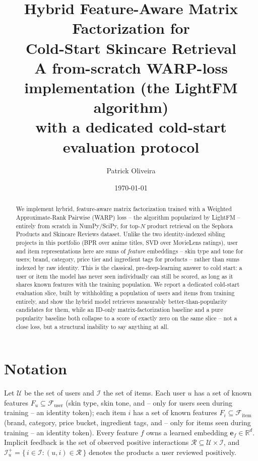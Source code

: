 \documentclass[11pt,a4paper]{article}
\title{\textbf{Hybrid Feature-Aware Matrix Factorization for\\
Cold-Start Skincare Retrieval}\\[0.4em]
\large A from-scratch WARP-loss implementation (the LightFM algorithm)\\
with a dedicated cold-start evaluation protocol}
\author{Patrick Oliveira}
\date{\today}
\newcommand{\Uset}{\mathcal{U}}
\newcommand{\Iset}{\mathcal{I}}
\newcommand{\Fset}{\mathcal{F}}
\newcommand{\Rset}{\mathcal{R}}
\newcommand{\evec}{\mathbf{e}}
\begin{document}
\maketitle

\begin{abstract}
We implement hybrid, feature-aware matrix factorization trained with a
Weighted Approximate-Rank Pairwise (WARP) loss -- the algorithm popularized by
LightFM -- entirely from scratch in NumPy/SciPy, for top-$N$ product
retrieval on the Sephora Products and Skincare Reviews dataset. Unlike the
two identity-indexed sibling projects in this portfolio (BPR over anime
titles, SVD over MovieLens ratings), user and item representations here are
sums of \emph{feature} embeddings -- skin type and tone for users; brand,
category, price tier and ingredient tags for products -- rather than sums
indexed by raw identity. This is the classical, pre-deep-learning answer to
cold start: a user or item the model has never seen individually can still be
scored, as long as it shares known features with the training population. We
report a dedicated cold-start evaluation slice, built by withholding a
population of users and items from training entirely, and show the hybrid
model retrieves measurably better-than-popularity candidates for them, while
an ID-only matrix-factorization baseline and a pure popularity baseline both
collapse to a score of exactly zero on the same slice -- not a close loss,
but a structural inability to say anything at all.
\end{abstract}

\tableofcontents
\newpage

\section{Notation}
\label{sec:notation}

Let $\Uset$ be the set of users and $\Iset$ the set of items. Each user $u$
has a set of known features $F_u \subseteq \Fset_{\text{user}}$ (skin type,
skin tone, and -- only for users seen during training -- an identity token);
each item $i$ has a set of known features $F_i \subseteq \Fset_{\text{item}}$
(brand, category, price bucket, ingredient tags, and -- only for items seen
during training -- an identity token). Every feature $f$ owns a learned
embedding $\evec_f \in \mathbb{R}^d$. Implicit feedback is the set of
observed positive interactions $\Rset \subseteq \Uset \times \Iset$, and
$\Iset_u^{+} = \{\, i \in \Iset : (u,i) \in \Rset \,\}$ denotes the products a
user reviewed positively.











\end{document}
